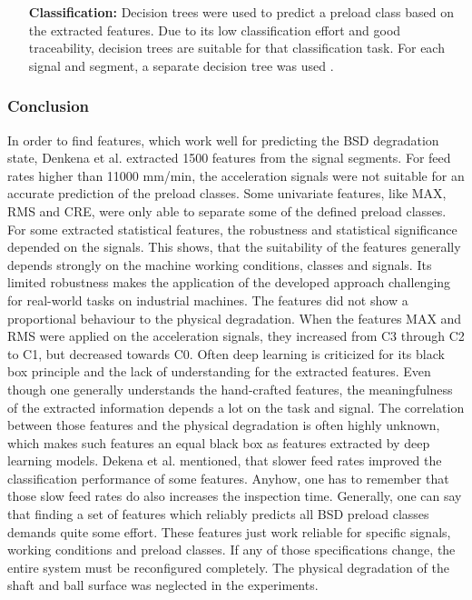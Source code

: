 \begin{itemize}
    \item [\textbf{Classification:}] Decision trees were used to predict a preload class based on the extracted features. Due to its low classification effort and good traceability, decision trees are suitable for that classification task. For each signal and segment, a separate decision tree was used \cite{Denkena2021}. 
\end{itemize}

\subsubsection{Conclusion}
In order to find features, which work well for predicting the BSD degradation state, Denkena et al. \cite{Denkena2021} extracted 1500 features from the signal segments. For feed rates higher than 11000 mm/min, the acceleration signals were not suitable for an accurate prediction of the preload classes. Some univariate features, like MAX, RMS and CRE, were only able to separate some of the defined preload classes. For some extracted statistical features, the robustness and statistical significance depended on the signals. This shows, that the suitability of the features generally depends strongly on the machine working conditions, classes and signals.
Its limited robustness makes the application of the developed approach challenging for real-world tasks on industrial machines. The features did not show a proportional behaviour to the physical degradation. When the features MAX and RMS were applied on the acceleration signals, they increased from C3 through C2 to C1, but decreased towards C0. Often deep learning is criticized for its black box principle and the lack of understanding for the extracted features. Even though one generally understands the hand-crafted features, the meaningfulness of the extracted information depends a lot on the task and signal. The correlation between those features and the physical degradation is often highly unknown, which makes such features an equal black box as features extracted by deep learning models. Dekena et al. \cite{Denkena2021} mentioned, that slower feed rates improved the classification performance of some features. Anyhow, one has to remember that those slow feed rates do also increases the inspection time. Generally, one can say that finding a set of features which reliably predicts all BSD preload classes demands quite some effort. These features just work reliable for specific signals, working conditions and preload classes. If any of those specifications change, 
the entire system must be reconfigured completely. The physical degradation of the shaft and ball surface was neglected in the experiments.

